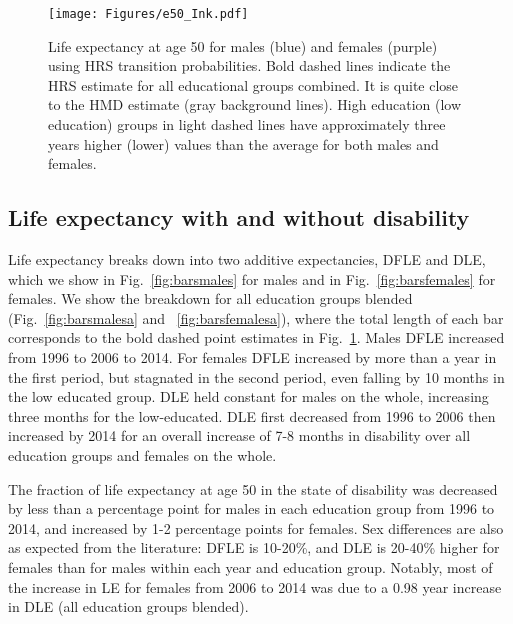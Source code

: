 \begin{figure}[ht!]
\centering
\texttt{[image: Figures/e50\_Ink.pdf]}
\caption{Life expectancy at age 50 for males (blue) and females (purple) using HRS transition probabilities. Bold dashed lines indicate the HRS estimate for all educational groups combined. It is quite close to the HMD estimate (gray background lines). High education (low education) groups in light dashed lines have approximately three years higher (lower) values than the average for both males and females.}
\label{fig:e50}
\end{figure}

\subsection{Life expectancy with and without disability}

Life expectancy breaks down into two additive expectancies, DFLE and DLE, which we show in Fig.~\ref{fig:barsmales} for males and in Fig.~\ref{fig:barsfemales} for females. We show the breakdown for all education groups blended (Fig.~\ref{fig:barsmalesa} and ~\ref{fig:barsfemalesa}), where the total length of each bar corresponds to the bold dashed point estimates in Fig.~\ref{fig:e50}. Males DFLE increased from 1996 to 2006 to 2014. For females DFLE increased by more than a year in the first period, but stagnated in the second period, even falling by 10 months in the low educated group. DLE held constant for males on the whole, increasing three months for the low-educated. DLE first decreased from 1996 to 2006 then increased by 2014 for an overall increase of 7-8 months in disability over all education groups and females on the whole.  

The fraction of life expectancy at age 50 in the state of disability was decreased by less than a percentage point for males in each education group from 1996 to 2014, and increased by 1-2 percentage points for females. Sex differences are also as expected from the literature: DFLE is 10-20\%, and DLE is 20-40\% higher for females than for males within each year and education group. Notably, most of the increase in LE for females from 2006 to 2014 was due to a 0.98 year increase in DLE (all education groups blended). 

